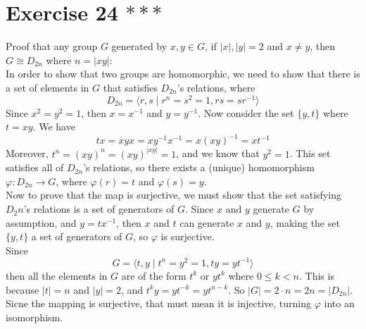 \documentclass{article}
\begin{document}
    
    \section*{Exercise 24 $***$}
    Proof that any group $G$ generated by $x, y \in G$,
    if $|x|, |y| = 2$ and $x \neq y$,
    then $G \cong D_{2n}$ where $n = |xy|$: \\
    In order to show that two groups are homomorphic,
    we need to show that there is a set of elements in $G$
    that satisfies $D_{2n}$'s relations,
    where \[ D_{2n} = \langle r, s \mid r^n = s^2 = 1, rs = sr^{-1} \rangle \]
    Since $x^2 = y^2 = 1$,
    then $x = x^{-1}$ and $y = y^{-1}$.
    Now consider the set $\{y, t\}$ where $t = xy$.
    We have \[ tx = xyx = xy^{-1}x^{-1} = x(xy)^{-1} = xt^{-1}\]
    Moreover, $t^n = (xy)^n = (xy)^{|xy|} = 1$,
    and we know that $y^2 = 1$.
    This set satisfies all of $D_{2n}$'s relations,
    so there exists a (unique) homomorphism $\varphi: D_{2n} \to G$,
    where $\varphi(r) = t$ and $\varphi(s) = y$. \\
    Now to prove that the map is surjective,
    we must show that the set satisfying $D_2n$'s relations is a set of
    generators of $G$.
    Since $x$ and $y$ generate $G$ by assumption, and $y = tx^{-1}$,
    then $x$ and $t$ can generate $x$ and $y$, 
    making the set $\{y, t\}$ a set of generators of $G$,
    so $\varphi$ is surjective. \\
    Since \[ G = \langle t, y \mid t^n = y^2 = 1, ty = yt^{-1} \rangle \]
    then all the elements in $G$ are of the form $t^k$ or $yt^k$
    where $0 \leqslant k < n$.
    This is because $|t| = n$ and $|y| = 2$,
    and $t^ky = yt^{-k} = yt^{n-k}$.
    So $|G| = 2 \cdot n = 2n = |D_{2n}|$.
    Sicne the mapping is surjective,
    that must mean it is injective,
    turning $\varphi$ into an isomorphism.
\end{document}
